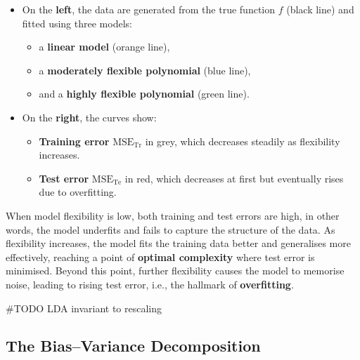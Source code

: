 \documentclass[
  letterpaper,
  DIV=11,
  numbers=noendperiod]{scrartcl}
\newenvironment{Shaded}{\begin{snugshade}}{\end{snugshade}}
\newcommand{\CommentTok}[1]{\textcolor[rgb]{0.37,0.37,0.37}{#1}}
\providecommand{\tightlist}{%
  \setlength{\itemsep}{0pt}\setlength{\parskip}{0pt}}\usepackage{longtable,booktabs,array}
\begin{document}
\begin{itemize}
\tightlist
\item
  On the \textbf{left}, the data are generated from the true function
  \(f\) (black line) and fitted using three models:

  \begin{itemize}
  \tightlist
  \item
    a \textbf{linear model} (orange line),
  \item
    a \textbf{moderately flexible polynomial} (blue line),
  \item
    and a \textbf{highly flexible polynomial} (green line).
  \end{itemize}
\item
  On the \textbf{right}, the curves show:

  \begin{itemize}
  \tightlist
  \item
    \textbf{Training error} \(\text{MSE}_{\text{Tr}}\) in grey, which
    decreases steadily as flexibility increases.
  \item
    \textbf{Test error} \(\text{MSE}_{\text{Te}}\) in red, which
    decreases at first but eventually rises due to overfitting.
  \end{itemize}
\end{itemize}

When model flexibility is low, both training and test errors are high,
in other words, the model underfits and fails to capture the structure
of the data. As flexibility increases, the model fits the training data
better and generalises more effectively, reaching a point of
\textbf{optimal complexity} where test error is minimised. Beyond this
point, further flexibility causes the model to memorise noise, leading
to rising test error, i.e., the hallmark of \textbf{overfitting}.

\begin{Shaded}
\begin{Highlighting}[]
\CommentTok{\#TODO LDA invariant to rescaling}
\end{Highlighting}
\end{Shaded}

\subsection{The Bias--Variance
Decomposition}\label{the-biasvariance-decomposition}
\end{document}
